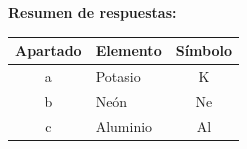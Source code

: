 \begin{exercise}
\begin{solu}
        \textbf{Resumen de respuestas:}
        \begin{center}
            \begin{tabular}{@{}clc@{}}
                \toprule
                \textbf{Apartado} & \textbf{Elemento} & \textbf{Símbolo} \\
                \midrule
                a & Potasio & K \\[3pt]
                b & Neón & Ne \\[3pt]
                c & Aluminio & Al \\[3pt]

\end{tabular}
\end{center}
\end{solu}
\end{exercise}
